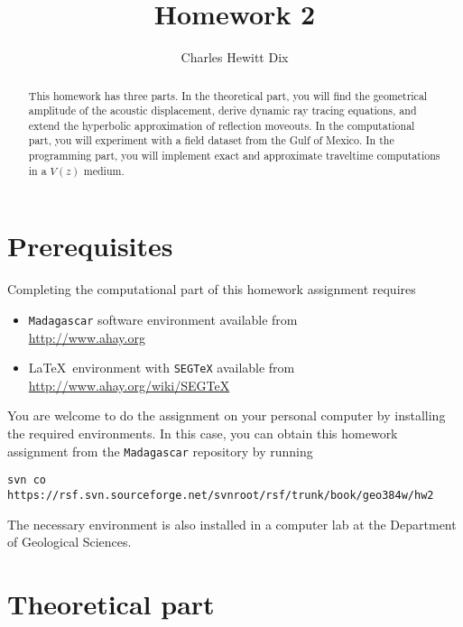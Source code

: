 \author{Charles Hewitt Dix} 
\title{Homework 2}

\begin{abstract}
  This homework has three parts. In the theoretical part, you will
  find the geometrical amplitude of the acoustic displacement, derive
  dynamic ray tracing equations, and extend the hyperbolic
  approximation of reflection moveouts. In the computational part, you
  will experiment with a field dataset from the Gulf of Mexico. In the
  programming part, you will implement exact and approximate
  traveltime computations in a $V(z)$ medium.
\end{abstract}

\section{Prerequisites}

Completing the computational part of this homework assignment requires
\begin{itemize}
\item \texttt{Madagascar} software environment available from \\
  \url{http://www.ahay.org}
\item \LaTeX\ environment with \texttt{SEGTeX} available from \\ 
  \url{http://www.ahay.org/wiki/SEGTeX}
\end{itemize}

You are welcome to do the assignment on your personal computer by
installing the required environments. In this case, you can obtain this
homework assignment from the \texttt{Madagascar} repository by running
\begin{verbatim}
svn co https://rsf.svn.sourceforge.net/svnroot/rsf/trunk/book/geo384w/hw2
\end{verbatim}

The necessary environment is also installed in a computer lab
at the Department of Geological Sciences.

\section{Theoretical part}

